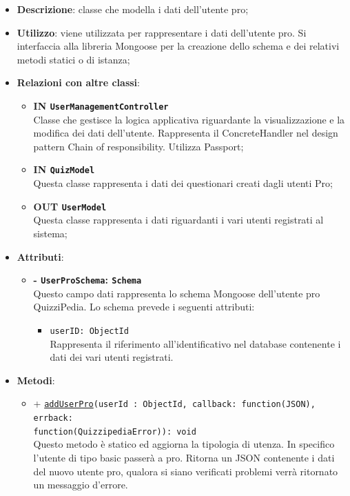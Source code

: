 \begin{itemize}
	\item \textbf{Descrizione}: classe che modella i dati dell'utente pro;
	\item \textbf{Utilizzo}: viene utilizzata per rappresentare i dati dell'utente pro. Si interfaccia alla libreria Mongoose per la creazione dello schema e dei relativi metodi statici o di istanza;
	\item \textbf{Relazioni con altre classi}:
		\begin{itemize}
			\item \textbf{IN \texttt {UserManagementController}} \\
			Classe che gestisce la logica applicativa riguardante la visualizzazione e la modifica dei dati dell'utente.
Rappresenta il ConcreteHandler nel design pattern Chain of responsibility. Utilizza Passport;
			\item \textbf{IN \texttt{QuizModel}} \\
			Questa classe rappresenta i dati dei questionari creati dagli utenti Pro;
			\item \textbf{OUT \texttt{UserModel}} \\
			Questa classe rappresenta i dati riguardanti i vari utenti registrati al sistema;
		\end{itemize}
	\item \textbf{Attributi}:
		\begin{itemize}
			\item \textbf{- \texttt{UserProSchema}: \texttt{Schema}} \\
			Questo campo dati rappresenta lo schema Mongoose dell'utente pro QuizziPedia. Lo schema prevede i seguenti attributi:
			\begin{itemize}
				\item 
					\texttt{userID: ObjectId}\\ Rappresenta il riferimento all'identificativo nel database contenente i dati dei vari utenti registrati.
			\end{itemize}		
		\end{itemize}	
	\item \textbf{Metodi}:
		\begin{itemize}
		\item
		+ \texttt{\underline{addUserPro}(userId : ObjectId, callback: function(JSON), errback: \\function(QuizzipediaError)): void} \\	
		Questo metodo è statico ed aggiorna la tipologia di utenza. In specifico l'utente di tipo basic passerà a pro. Ritorna un JSON contenente i dati del nuovo utente pro, qualora si siano verificati problemi verrà ritornato un messaggio d'errore.	\\	

\end{itemize}
\end{itemize}
